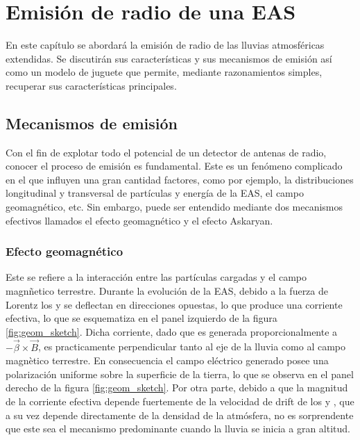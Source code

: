 \chapter{Emisi\'on de radio de una EAS}
\label{ch:easRadio}

En este capítulo se abordará la emisión de radio de las lluvias atmosféricas extendidas.
Se discutirán sus características y sus mecanismos de emisión así como un modelo de juguete que permite, mediante razonamientos simples, recuperar sus características principales.

\section{Mecanismos de emisi\'on}
	\label{sc:emision}
	
	Con el fin de explotar todo el potencial de un detector de antenas de radio, conocer el proceso de emisión es fundamental. 
	Este es un fenómeno complicado en el que influyen una gran cantidad factores, como por ejemplo, la distribuciones longitudinal y transversal de partículas y energía de la EAS, el campo geomagnético, etc.
	Sin embargo, puede ser entendido mediante dos mecanismos efectivos llamados el efecto geomagn\'etico y el efecto Askaryan.
	
	\subsection{Efecto geomagn\'etico}
	
	Este se refiere a la interacción entre las partículas cargadas y el campo magnñetico terrestre.
	Durante la evoluci\'on de la EAS, debido a la fuerza de Lorentz los \el{+} y \el{-} se deflectan en direcciones opuestas, lo que produce una corriente efectiva, lo que se esquematiza en el panel izquierdo de la figura \ref{fig:geom_sketch}.
	Dicha corriente, dado que es generada proporcionalmente a $-\vec\beta\times \vec B$, es practicamente perpendicular tanto al eje de la lluvia como al campo magn\`etico terrestre.
	En consecuencia el campo el\'ectrico generado posee una polarizaci\'on uniforme sobre la superficie de la tierra, lo que se observa en el panel derecho de la figura \ref{fig:geom_sketch}.
	Por otra parte, debido a que la magnitud de la corriente efectiva depende fuertemente de la velocidad de drift de los \el{+} y \el{-}, que a su vez depende directamente de la densidad de la atm\'osfera, no es sorprendente que este sea el mecanismo predominante cuando la lluvia se inicia a gran altitud.
	

